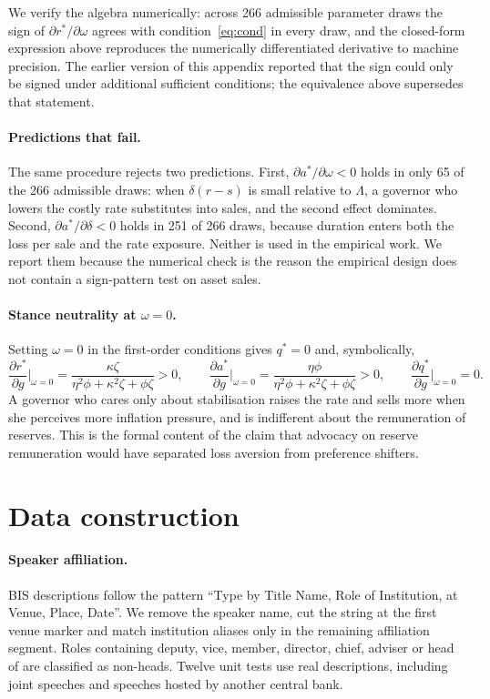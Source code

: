 \documentclass[11pt]{article}
\theoremstyle{plain}
\begin{document}
We verify the algebra numerically: across 266 admissible parameter draws the sign of $\partial r^*/\partial\omega$ agrees with condition~\eqref{eq:cond} in every draw, and the closed-form expression above reproduces the numerically differentiated derivative to machine precision. The earlier version of this appendix reported that the sign could only be signed under additional sufficient conditions; the equivalence above supersedes that statement.

\paragraph{Predictions that fail.}
The same procedure rejects two predictions. First, $\partial a^*/\partial\omega<0$ holds in only 65 of the 266 admissible draws: when $\delta(r-s)$ is small relative to $\Lambda$, a governor who lowers the costly rate substitutes into sales, and the second effect dominates. Second, $\partial a^*/\partial\delta<0$ holds in 251 of 266 draws, because duration enters both the loss per sale and the rate exposure. Neither is used in the empirical work. We report them because the numerical check is the reason the empirical design does not contain a sign-pattern test on asset sales.

\paragraph{Stance neutrality at $\omega=0$.}
Setting $\omega=0$ in the first-order conditions gives $q^*=0$ and, symbolically,
\[
\frac{\partial r^*}{\partial g}\Big|_{\omega=0}=\frac{\kappa\zeta}{\eta^2\phi+\kappa^2\zeta+\phi\zeta}>0,\qquad
\frac{\partial a^*}{\partial g}\Big|_{\omega=0}=\frac{\eta\phi}{\eta^2\phi+\kappa^2\zeta+\phi\zeta}>0,\qquad
\frac{\partial q^*}{\partial g}\Big|_{\omega=0}=0 .
\]
A governor who cares only about stabilisation raises the rate and sells more when she perceives more inflation pressure, and is indifferent about the remuneration of reserves. This is the formal content of the claim that advocacy on reserve remuneration would have separated loss aversion from preference shifters.

\section{Data construction}\label{app:data}
\paragraph{Speaker affiliation.} BIS descriptions follow the pattern ``Type by Title Name, Role of Institution, at Venue, Place, Date''. We remove the speaker name, cut the string at the first venue marker and match institution aliases only in the remaining affiliation segment. Roles containing deputy, vice, member, director, chief, adviser or head of are classified as non-heads. Twelve unit tests use real descriptions, including joint speeches and speeches hosted by another central bank.
\end{document}
